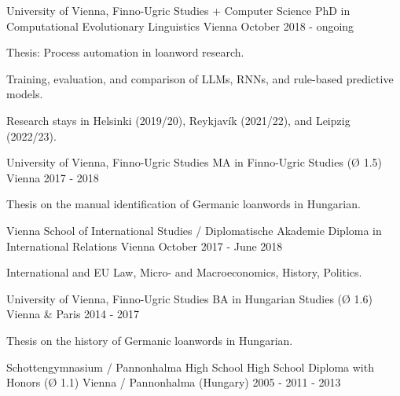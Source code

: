 

\begin{cventries}

  \cventry
    {University of Vienna, Finno-Ugric Studies + Computer Science} %
    {PhD in Computational Evolutionary Linguistics} %
    {Vienna} %
    {October 2018 - ongoing} %
    {
      \begin{cvitems} %
        \item{Thesis: Process automation in loanword research.}
        \item{Training, evaluation, and comparison of LLMs, RNNs, and rule-based predictive models.}
        \item{Research stays in Helsinki (2019/20), Reykjavík (2021/22), and Leipzig (2022/23).}
      \end{cvitems}
    }

  \cventry
    {University of Vienna, Finno-Ugric Studies} %
    {MA in Finno-Ugric Studies (Ø 1.5)} %
    {Vienna} %
    {2017 - 2018} %
    {
      \begin{cvitems} %
        \item{Thesis on the manual identification of Germanic loanwords in Hungarian.}
      \end{cvitems}
    }

  \cventry
    {Vienna School of International Studies / Diplomatische Akademie} %
    {Diploma in International Relations} %
    {Vienna} %
    {October 2017 - June 2018} %
    {
    \begin{cvitems} %
        \item{International and EU Law, Micro- and Macroeconomics, History, Politics.}
      \end{cvitems}
    }
    
  \cventry
    {University of Vienna, Finno-Ugric Studies} %
    {BA in Hungarian Studies (Ø 1.6)} %
    {Vienna \& Paris} %
    {2014 - 2017} %
    {
      \begin{cvitems} %
        \item{Thesis on the history of Germanic loanwords in Hungarian.}
      \end{cvitems}
    }
        
  \cventry
    {Schottengymnasium / Pannonhalma High School} %
    {High School Diploma with Honors (Ø 1.1)} %
    {Vienna / Pannonhalma (Hungary)} %
    {2005 - 2011 - 2013} %
    {}
\end{cventries}
